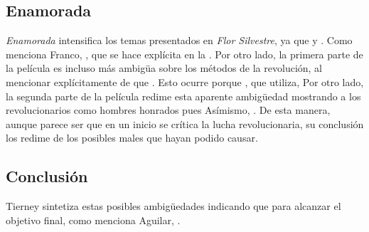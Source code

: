 \subsection{Enamorada}
\emph{Enamorada} intensifica los temas presentados en \emph{Flor Silvestre}, ya que 
\autocite[14:11]{fernandez_enamorada_1946} 
y 
\autocite[5:31-5:46]{fernandez_enamorada_1946}. 
Como menciona Franco,
\autocite[377]{sanchez_vi._2010}, 
que se hace explícita en la 
\autocite[4:57-5:13]{fernandez_enamorada_1946}. 
Por otro lado, la primera parte de la película es incluso más ambigüa sobre los métodos de la revolución, 
al mencionar explícitamente de que 
\autocite[39:00]{fernandez_enamorada_1946}.
Esto ocurre porque
\autocite[4:57-5:13]{fernandez_enamorada_1946}
, que utiliza, 
\autocite[18:30]{fernandez_enamorada_1946} 
\autocite[21:38]{fernandez_enamorada_1946} 
Por otro lado, la segunda parte de la película redime esta aparente ambigüedad mostrando a los revolucionarios como hombres honrados pues 
\autocite[1:27:21-1:35:20]{fernandez_enamorada_1946}
Asímismo,
\autocite[03:04]{fernandez_enamorada_1946}.
De esta manera, aunque parece ser que en un inicio se crítica la lucha revolucionaria, su conclusión los redime de los posibles males que hayan podido causar. 

\subsection{Conclusión}
Tierney sintetiza  estas posibles ambigüedades indicando que 
\autocite[48]{tierney_myths_2002}
para alcanzar el objetivo final, como menciona Aguilar, 
\autocite[158]{aguilar_construccion_2014-1}. 


\pagebreak
